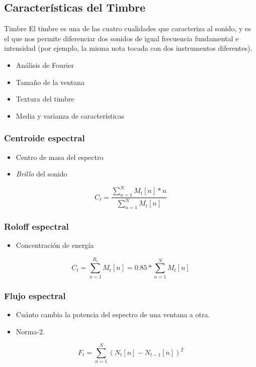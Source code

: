\documentclass{beamer}
\begin{document}
\subsection{Características del Timbre}
\begin{frame}

\begin{block}{Timbre}
El timbre es una de las cuatro cualidades que caracteriza al sonido, y es el que nos permite diferenciar dos sonidos de igual frecuencia fundamental e intensidad (por ejemplo, la misma nota tocada con dos instrumentos diferentes). 
\end{block}

\begin{itemize}
\item Análisis de Fourier
\item Tamaño de la ventana
\item Textura del timbre
\item Media y varianza de características
\end{itemize}

\end{frame}

\begin{frame}
\frametitle{Centroide espectral}

\begin{itemize}
\item Centro de masa del espectro
\item \textit{Brillo} del sonido
\end{itemize}

$$C_t = \dfrac{\sum_{n=1}^{N} M_t[n] * n}{\sum_{n=1}^{N} M_t[n]}$$

\end{frame}

\begin{frame}
\frametitle{Roloff espectral}
\begin{itemize}
\item Concentración de energía
\end{itemize}
$$C_t = \sum_{n=1}^{R_t} M_t[n] = 0.85 * \sum_{n=1}^{N} M_t[n] $$
\end{frame}

\begin{frame}
\frametitle{Flujo espectral}
\begin{itemize}
\item Cuánto cambia la potencia del espectro de una ventana a otra.
\item Norma-2.
\end{itemize}
$$F_t  = \sum_{n=1}^{N} (N_t[n]-N_{t-1}[n])^2$$
\end{frame}
\end{document}
